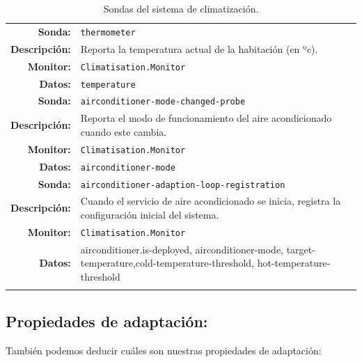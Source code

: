 \begin{longtable}{|r p{11.5cm}|}
    \hline
    \textbf{Sonda:} & \texttt{thermometer}  \\
    \textbf{Descripción:} & Reporta la temperatura actual de la habitación (en ºc). \\
    \textbf{Monitor:} & \texttt{Climatisation.Monitor} \\
    \textbf{Datos:} & \texttt{temperature} \\
    \hline
    \textbf{Sonda:} & \texttt{airconditioner-mode-changed-probe}  \\
    \textbf{Descripción:} & Reporta el modo de funcionamiento del aire acondicionado cuando este cambia. \\
    \textbf{Monitor:} & \texttt{Climatisation.Monitor} \\
    \textbf{Datos:} & \texttt{airconditioner-mode} \\
    \hline
    \textbf{Sonda:} & \texttt{airconditioner-adaption-loop-registration}  \\
    \textbf{Descripción:} & Cuando el servicio de aire acondicionado se inicia, registra la configuración inicial del sistema. \\
    \textbf{Monitor:} & \texttt{Climatisation.Monitor} \\
    \textbf{Datos:} &  \ttfamily\selectfont airconditioner.is-deployed, airconditioner-mode, target-temperature,cold-temperature-threshold, hot-temperature-threshold \\
    \hline

    \caption{Sondas del sistema de climatización.}
    \label{tab:climatisation-probes}
\end{longtable}

\subsection{Propiedades de adaptación:}

También podemos deducir cuáles son nuestras propiedades de adaptación:

